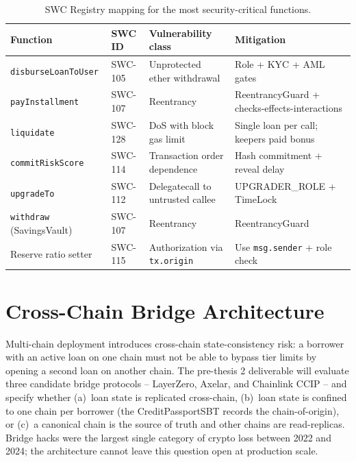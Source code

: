 \documentclass[12pt,a4paper]{report}
\begin{document}
\begin{table}[!t]
\centering
\caption{SWC Registry mapping for the most security-critical functions.}
\label{tab:swc}
\small
\begin{tabularx}{\linewidth}{@{}p{4.0cm}p{1.6cm}YL{3.0cm}@{}}
\toprule
\textbf{Function} & \textbf{SWC ID} & \textbf{Vulnerability class} & \textbf{Mitigation} \\
\midrule
\texttt{disburseLoanToUser} & SWC-105 & Unprotected ether withdrawal & Role + KYC + AML gates \\
\texttt{payInstallment} & SWC-107 & Reentrancy & ReentrancyGuard + checks-effects-interactions \\
\texttt{liquidate} & SWC-128 & DoS with block gas limit & Single loan per call; keepers paid bonus \\
\texttt{commitRiskScore} & SWC-114 & Transaction order dependence & Hash commitment + reveal delay \\
\texttt{upgradeTo} & SWC-112 & Delegatecall to untrusted callee & UPGRADER\_ROLE + TimeLock \\
\texttt{withdraw} (SavingsVault) & SWC-107 & Reentrancy & ReentrancyGuard \\
Reserve ratio setter & SWC-115 & Authorization via \texttt{tx.origin} & Use \texttt{msg.sender} + role check \\
\bottomrule
\end{tabularx}
\end{table}

\section{Cross-Chain Bridge Architecture}
\label{sec:bridge}

Multi-chain deployment introduces cross-chain state-consistency risk: a borrower with an active loan on one chain must not be able to bypass tier limits by opening a second loan on another chain. The pre-thesis 2 deliverable will evaluate three candidate bridge protocols -- LayerZero, Axelar, and Chainlink CCIP -- and specify whether (a)~loan state is replicated cross-chain, (b)~loan state is confined to one chain per borrower (the CreditPassportSBT records the chain-of-origin), or (c)~a canonical chain is the source of truth and other chains are read-replicas. Bridge hacks were the largest single category of crypto loss between 2022 and 2024; the architecture cannot leave this question open at production scale.

\end{document}

